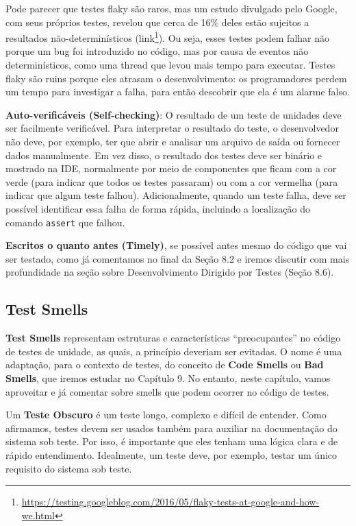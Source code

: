 \documentclass[
  11pt,
  twoside]{book}
\newcommand{\passthrough}[1]{#1}
\DeclareRobustCommand{\href}[2]{#2\footnote{\url{#1}}}
\begin{document}
Pode parecer que testes flaky são raros, mas um estudo divulgado pelo
Google, com seus próprios testes, revelou que cerca de 16\% deles estão
sujeitos a resultados não-determinísticos
(\href{https://testing.googleblog.com/2016/05/flaky-tests-at-google-and-how-we.html}{link}).
Ou seja, esses testes podem falhar não porque um bug foi introduzido no
código, mas por causa de eventos não determinísticos, como uma thread
que levou mais tempo para executar. Testes flaky são ruins porque eles
atrasam o desenvolvimento: os programadores perdem um tempo para
investigar a falha, para então descobrir que ela é um alarme falso.

\textbf{Auto-verificáveis (Self-checking)}: O resultado de um teste de
unidades deve ser facilmente verificável. Para interpretar o resultado
do teste, o desenvolvedor não deve, por exemplo, ter que abrir e
analisar um arquivo de saída ou fornecer dados manualmente. Em vez
disso, o resultado dos testes deve ser binário e mostrado na IDE,
normalmente por meio de componentes que ficam com a cor verde (para
indicar que todos os testes passaram) ou com a cor vermelha (para
indicar que algum teste falhou). Adicionalmente, quando um teste falha,
deve ser possível identificar essa falha de forma rápida, incluindo a
localização do comando \passthrough{\lstinline!assert!} que falhou.

\textbf{Escritos o quanto antes (Timely)}, se possível antes mesmo do
código que vai ser testado, como já comentamos no final da Seção 8.2 e
iremos discutir com mais profundidade na seção sobre Desenvolvimento
Dirigido por Testes (Seção 8.6).

\hypertarget{test-smells}{%
\subsection{Test Smells}\label{test-smells}}


\textbf{Test Smells} representam estruturas e características
``preocupantes'' no código de testes de unidade, as quais, a princípio
deveriam ser evitadas. O nome é uma adaptação, para o contexto de
testes, do conceito de \textbf{Code Smells} ou \textbf{Bad Smells}, que
iremos estudar no Capítulo 9. No entanto, neste capítulo, vamos
aproveitar e já comentar sobre smells que podem ocorrer no código de
testes.

Um \textbf{Teste Obscuro} é um teste longo, complexo e difícil de
entender. Como afirmamos, testes devem ser usados também para auxiliar
na documentação do sistema sob teste. Por isso, é importante que eles
tenham uma lógica clara e de rápido entendimento. Idealmente, um teste
deve, por exemplo, testar um único requisito do sistema sob teste.
\end{document}
